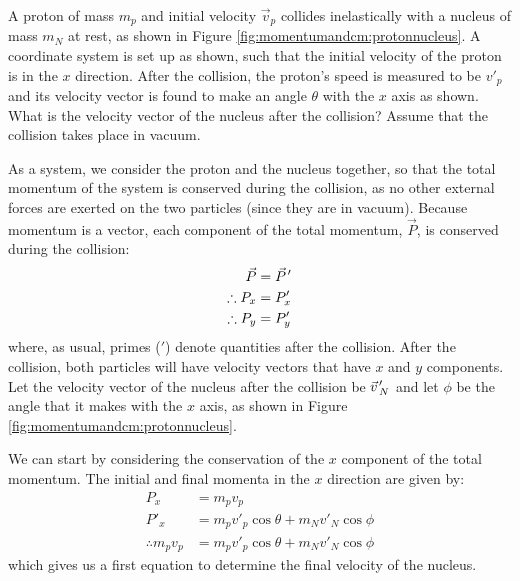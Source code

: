 \begin{example}{
A proton of mass $m_p$ and initial velocity $\vec v_p$ collides inelastically with a nucleus of mass $m_N$ at rest, as shown in Figure \ref{fig:momentumandcm:protonnucleus}. A coordinate system is set up as shown, such that the initial velocity of the proton is in the $x$ direction. After the collision, the proton's speed is measured to be $v'_p$ and its velocity vector is found to make an angle $\theta$ with the $x$ axis as shown. What is the velocity vector of the nucleus after the collision? Assume that the collision takes place in vacuum.
}

As a system, we consider the proton and the nucleus together, so that the total momentum of the system is conserved during the collision, as no other external forces are exerted on the two particles (since they are in vacuum). Because momentum is a vector, each component of the total momentum, $\vec P$, is conserved during the collision:
\begin{align*}
\vec P &= \pvec P'\\
\therefore P_x &= P'_x\\
\therefore P_y &= P'_y
\end{align*}
where, as usual, primes ($'$) denote quantities after the collision. After the collision, both particles will have velocity vectors that have $x$ and $y$ components. Let the velocity vector of the nucleus after the collision be $\pvec v'_N$ and let $\phi$ be the angle that it makes with the $x$ axis, as shown in Figure \ref{fig:momentumandcm:protonnucleus}. 

We can start by considering the conservation of the $x$ component of the total momentum. The initial and final momenta in the $x$ direction are given by:
\begin{align*}
P_x &= m_p v_p\\
P'_x &= m_p v'_p\cos\theta + m_N v'_N\cos\phi\\
\therefore m_p v_p &= m_p v'_p\cos\theta + m_N v'_N\cos\phi
\end{align*}
which gives us a first equation to determine the final velocity of the nucleus.


\end{example}
